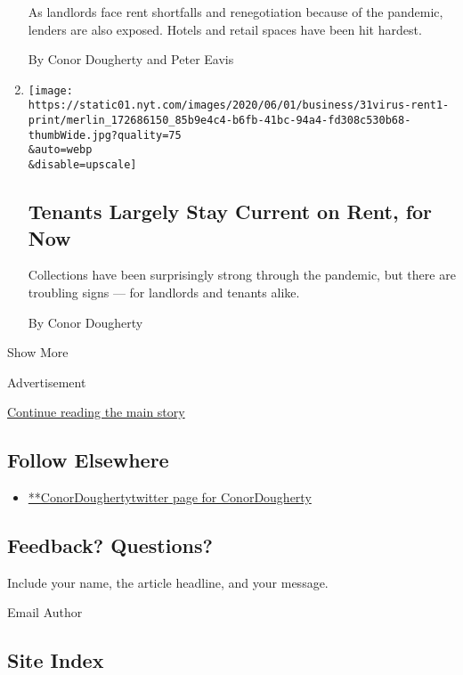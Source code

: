 \begin{enumerate}
  As landlords face rent shortfalls and renegotiation because of the
  pandemic, lenders are also exposed. Hotels and retail spaces have been
  hit hardest.

  By Conor Dougherty and Peter Eavis
\item
  \href{/2020/05/31/business/economy/coronavirus-rent-landlords-tenants.html}{}

  \texttt{[image: https://static01.nyt.com/images/2020/06/01/business/31virus-rent1-print/merlin\_172686150\_85b9e4c4-b6fb-41bc-94a4-fd308c530b68-thumbWide.jpg?quality=75\\\&auto=webp\\\&disable=upscale]}

  \hypertarget{tenants-largely-stay-current-on-rent-for-now}{%
  \subsection{Tenants Largely Stay Current on Rent, for
  Now}\label{tenants-largely-stay-current-on-rent-for-now}}

  Collections have been surprisingly strong through the pandemic, but
  there are troubling signs --- for landlords and tenants alike.

  By Conor Dougherty
\end{enumerate}

Show More

Advertisement

\protect\hyperlink{after-mid2}{Continue reading the main story}

\hypertarget{follow-elsewhere}{%
\subsection{Follow Elsewhere}\label{follow-elsewhere}}

\begin{itemize}
\tightlist
\item
  \href{https://twitter.com/ConorDougherty}{**ConorDoughertytwitter page
  for ConorDougherty}
\end{itemize}

\hypertarget{feedback-questions}{%
\subsection{Feedback? Questions?}\label{feedback-questions}}

Include your name, the article headline, and your message.

Email Author

\hypertarget{site-index}{%
\subsection{Site Index}\label{site-index}}

